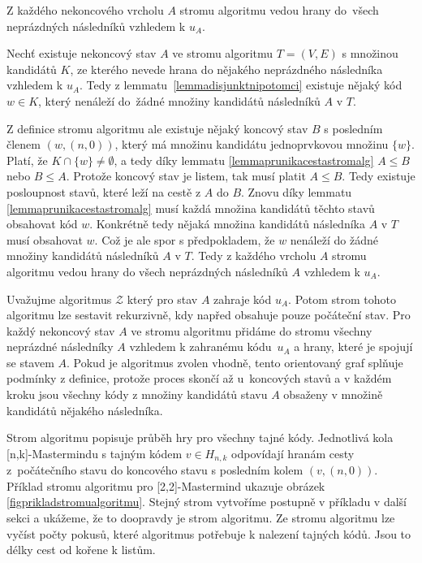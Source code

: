 \begin{tvrz}\label{tvrzvsichninaslednici}
    Z každého nekoncového vrcholu $A$ stromu algoritmu vedou hrany do~všech neprázdných následníků vzhledem k $u_A$.
\end{tvrz}
\begin{dukaz}
    Nechť existuje nekoncový stav $A$ ve stromu algoritmu $T = (V,E)$ s množinou kandidátů $K$, ze kterého nevede hrana do nějakého neprázdného následníka vzhledem k $u_A$. Tedy z lemmatu~\ref{lemmadisjunktnipotomci} existuje nějaký kód $w \in K$, který nenáleží do~žádné množiny kandidátů následníků $A$ v $T$. 

    Z definice stromu algoritmu ale existuje nějaký koncový stav $B$ s posledním členem $(w,(n,0))$, který má množinu kandidátu jednoprvkovou množinu $\{w\}$. Platí, že $K\cap \{w\} \neq \emptyset$, a tedy díky lemmatu \ref{lemmaprunikacestastromalg} $A \leq B$ nebo $B \leq A$. Protože koncový stav je listem, tak musí platit $A \leq B$. Tedy existuje posloupnost stavů, které leží na cestě z $A$ do $B$. Znovu díky lemmatu \ref{lemmaprunikacestastromalg} musí každá množina kandidátů těchto stavů obsahovat kód $w$. Konkrétně tedy nějaká množina kandidátů následníka $A$ v $T$ musí obsahovat $w$. Což je ale spor s předpokladem, že $w$ nenáleží do žádné množiny kandidátů následníků $A$ v $T$. Tedy z každého vrcholu $A$ stromu algoritmu vedou hrany do všech neprázdných následníků $A$ vzhledem k $u_A$. 
\end{dukaz}


\begin{pozn}
    Uvažujme algoritmus $\mathcal{Z}$ který pro stav $A$ zahraje kód $u_A$. Potom strom tohoto algoritmu lze sestavit rekurzivně, kdy napřed obsahuje pouze počáteční stav. Pro každý nekoncový stav $A$ ve stromu algoritmu přidáme do stromu všechny neprázdné následníky $A$ vzhledem k zahranému kódu~$u_A$ a hrany, které je spojují se stavem $A$. 
    Pokud je algoritmus zvolen vhodně, tento orientovaný graf splňuje podmínky z definice, protože proces skončí až u~koncových stavů a v každém kroku jsou všechny kódy z množiny kandidátů stavu $A$ obsaženy v množině kandidátů nějakého následníka.
\end{pozn}
 Strom algoritmu popisuje průběh hry pro všechny tajné kódy. Jednotlivá kola [n,k]-Mastermindu s tajným kódem $v\in H_{n,k}$ odpovídají hranám cesty z~počátečního stavu do koncového stavu s posledním kolem $(v,(n,0))$. Příklad stromu algoritmu pro [2,2]-Mastermind ukazuje obrázek \ref{figprikladstromualgoritmu}. Stejný strom vytvoříme postupně v příkladu v další sekci a ukážeme, že to doopravdy je strom algoritmu. Ze stromu algoritmu lze vyčíst počty pokusů, které algoritmus potřebuje k nalezení tajných kódů. Jsou to délky cest od kořene k listům.

